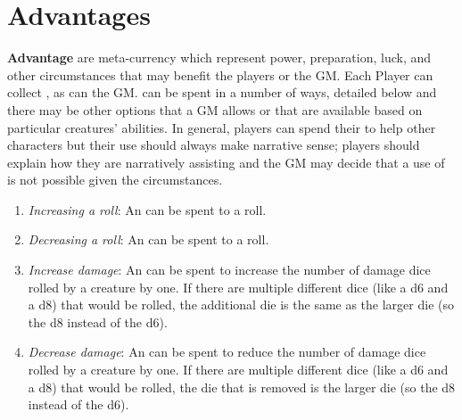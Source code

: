 \section{Advantages}\label{sec:advantage}
\textbf{Advantage} are meta-currency which represent power, preparation, luck, and other circumstances that may benefit the players or the GM.
Each Player can collect \Advantage, as can the GM.
\Advantage{} can be spent in a number of ways, detailed below and there may be other options that a GM allows or that are available based on particular creatures' abilities.
In general, players can spend their \Advantage{} to help other characters but their use should always make narrative sense; players should explain how they are narratively assisting and the GM may decide that a use of \Advantage{} is not possible given the circumstances.
\begin{enumerate}
  \item \emph{Increasing a roll}: An \Advantage{} can be spent to \Increase{} a roll.
  \item \emph{Decreasing a roll}: An \Advantage{} can be spent to \Decrease{} a roll.
  \item \emph{Increase damage}: An \Advantage{} can be spent to increase the number of damage dice rolled by a creature by one.
    If there are multiple different dice (like a d6 and a d8) that would be rolled, the additional die is the same as the larger die (so the d8 instead of the d6).
  \item \emph{Decrease damage}: An \Advantage{} can be spent to reduce the number of damage dice rolled by a creature by one.
    If there are multiple different dice (like a d6 and a d8) that would be rolled, the die that is removed is the larger die (so the d8 instead of the d6).
\end{enumerate}
